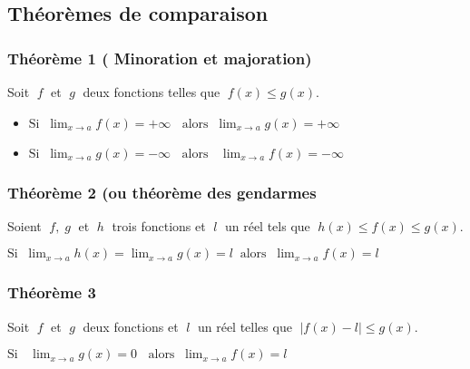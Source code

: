       \subsection{Théorèmes de comparaison}
\subsubsection*{Théorème 1 ( Minoration et  majoration)}
     \begin{theorem}
           Soit $\;f \;$ et $\;g \;$  deux fonctions telles que $\;   f(x)\leq g(x) $.
        \begin{itemize}           
         \item  $  \text{Si}\; \;\displaystyle \lim_{x \to a}{f(x)} =+\infty \;\; \text{ alors} \;\; \displaystyle\lim_{x \to a}{g(x)} =+\infty$
          
          
        \item   $ \text{Si}\;\; \displaystyle \lim_{x \to a}{g(x)} =-\infty \;\; \text{ alors }\;\; \lim_{x \to a}{f(x)} =-\infty$
          \end{itemize}
       \end{theorem}
     
      \subsubsection*{Théorème 2 (ou théorème  des gendarmes}
          \begin{theorem}
            Soient  $\; f  , \; g  \; $  et  $ \; h \;$  trois fonctions et  $\;l \;$ un réel tels que  $ \; h(x)\leq f(x) \leq g(x).$
            
           $ \text{Si}\;  \; \displaystyle\lim_{x \to a}{h(x)} =\displaystyle\lim_{x \to a}{g(x)}=l  \;\; \text{alors} \;\; \lim_{x \to a}{f(x)} =l$ 
       \end{theorem}
     \subsubsection*{Théorème 3}
      \begin{theorem} Soit $\;  f \; $ et $\; g \;$  deux fonctions et $\; l  \; $  un réel telles que $\;\left|f(x)-l\right| \leq g(x).$
      
     $ \text{Si }\; \;\displaystyle\lim_{x \to a}{g(x)} =0 \;\; \text{ alors}\; \;\displaystyle \lim_{x \to a}{f(x)} =l$
     \end{theorem}
